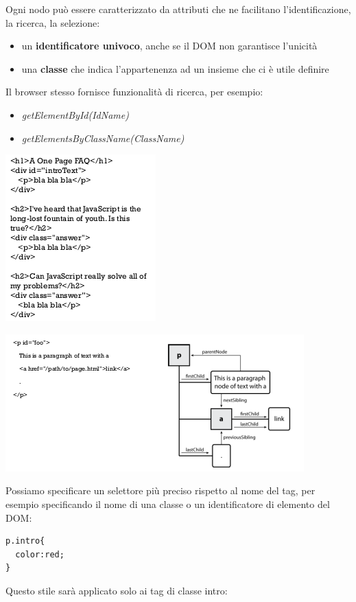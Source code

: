\documentclass[a4paper,12pt, oneside]{book}
\begin{document}
\newpage
Ogni nodo può essere caratterizzato da
attributi che ne facilitano l'identificazione, la ricerca, la selezione:
\begin{itemize}
\item un \textbf{identificatore univoco}, anche se il DOM non garantisce l'unicità
\item una \textbf{classe} che indica l'appartenenza ad
un insieme che ci è utile definire
\end{itemize}
Il browser stesso fornisce funzionalità di ricerca, per esempio:
\begin{itemize}
\item \textit{getElementById(IdName)}
\item \textit{getElementsByClassName(ClassName)}
\end{itemize}
\begin{center}
\includegraphics[scale=2.9]{img/dom2.png}
\end{center}
\begin{center}
\includegraphics[scale=0.9]{img/dom3.png}
\end{center}
\newpage
Possiamo specificare un selettore più preciso rispetto al
nome del tag, per esempio specificando il nome di una
classe o un identificatore di elemento del DOM:
\begin{verbatim}
p.intro{
  color:red;
}
\end{verbatim}
Questo stile sarà applicato solo ai tag di classe intro:
\end{document}
